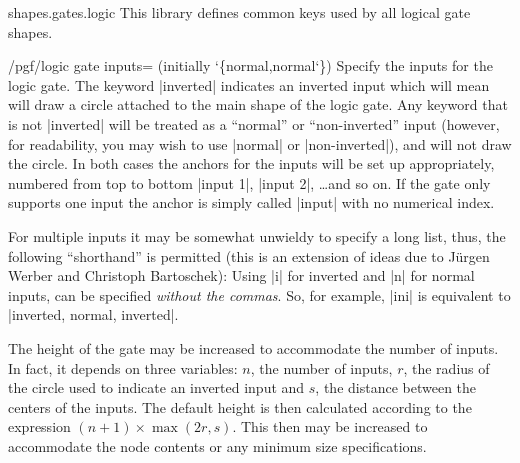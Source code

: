 \begin{pgflibrary}{shapes.gates.logic}
    This library defines common keys used by all logical gate shapes.

    \begin{key}{/pgf/logic gate inputs= (initially \char`\{normal,normal\char`\})}
    \label{logic-gate-inputs}%
        Specify the inputs for the logic gate. The keyword |inverted| indicates
        an inverted input which will mean \pgfname{} will draw a circle
        attached to the main shape of the logic gate. Any keyword that is not
        |inverted| will be treated as a ``normal'' or ``non-inverted'' input
        (however, for readability, you may wish to use |normal| or
        |non-inverted|), and \pgfname{} will not draw the circle. In both cases
        the anchors for the inputs will be set up appropriately, numbered from
        top to bottom |input 1|, |input 2|, \ldots and so on. If the gate only
        supports one input the anchor is simply called |input| with no
        numerical index.
\begin{codeexample}[]
\end{codeexample}

        For multiple inputs it may be somewhat unwieldy to specify a long list,
        thus, the following ``shorthand'' is permitted (this is an extension of
        ideas due to Jürgen Werber and Christoph Bartoschek): Using |i| for
        inverted and |n| for normal inputs,  can be specified
        \emph{without the commas}. So, for example, |ini| is equivalent to
        |inverted, normal, inverted|.
\begin{codeexample}[]
\end{codeexample}
    \end{key}

    The height of the gate may be increased to accommodate the number of
    inputs. In fact, it depends on three variables: $n$, the number of inputs,
    $r$, the radius of the circle used to indicate an inverted input and $s$,
    the distance between the centers of the inputs. The default height is then
    calculated according to the expression $(n+1)\times\max(2r,s)$. This then
    may be increased to accommodate the node contents or any minimum size
    specifications.


\end{pgflibrary}
